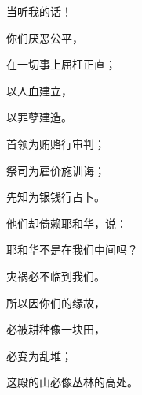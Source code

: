 {\par }{\Q 当听我的话！
\par }{\Q 你们厌恶公平，
\par }{\Q 在一切事上屈枉正直；
\par }{\Q {}以人血建立{}，
\par }{\Q 以罪孽建造{}。
\par }{\Q {}首领为贿赂行审判；
\par }{\Q 祭司为雇价施训诲；
\par }{\Q 先知为银钱行占卜。
\par }{\Q 他们却倚赖耶和华，说：
\par }{\Q 耶和华不是在我们中间吗？
\par }{\Q 灾祸必不临到我们。
\par }{\Q {}所以因你们的缘故，
\par }{必被耕种像一块田，
\par }{必变为乱堆；
\par }{\Q 这殿的山必像丛林的高处。

}
